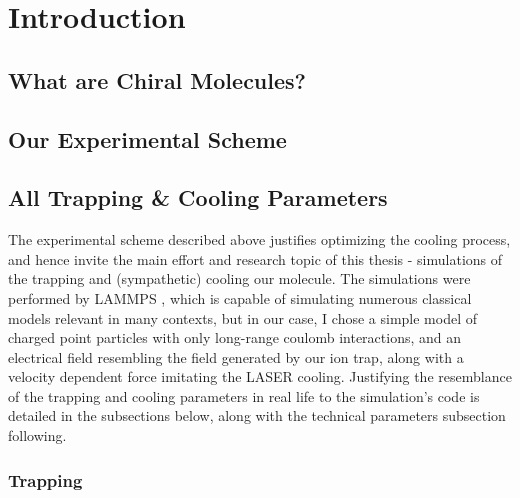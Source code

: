 \chapter{Introduction}\label{chap:intro}



\section{What are Chiral Molecules?}\label{what-are-chiral-molecules}

\section{Our Experimental Scheme}\label{our-experimental-scheme}


\section{All Trapping \& Cooling Parameters}\label{all-trapping-cooling-parameters}

The experimental scheme described above justifies optimizing the cooling
process, and hence invite the main effort and research topic of this
thesis - simulations of the trapping and (sympathetic) cooling our
molecule. The simulations were performed by LAMMPS , which is capable of
simulating numerous classical models relevant in many contexts, but in
our case, I chose a simple model of charged point particles with only
long-range coulomb interactions, and an electrical field resembling the
field generated by our ion trap, along with a velocity dependent force
imitating the LASER cooling. Justifying the resemblance of the trapping
and cooling parameters in real life to the simulation's code is detailed
in the subsections below, along with the technical parameters subsection
following.

\subsection{Trapping}\label{trapping}

